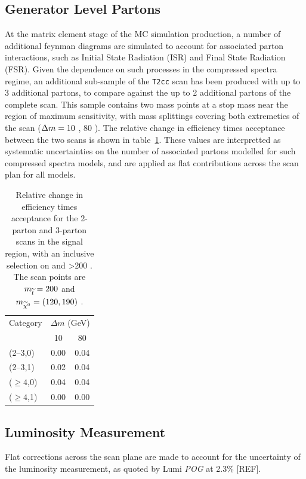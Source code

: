 \subsection{Generator Level Partons}
At the \MADGRAPH matrix element stage of the MC simulation production, a number
of additional feynman diagrams are simulated to account for associated parton 
interactions, such as Initial State Radiation (ISR) and Final State Radiation
(FSR). Given the dependence on such processes in the
compressed spectra regime, an additional sub-sample of the \texttt{T2cc} scan 
has been produced with up to 3 additional partons, to compare against the up to
2 additional partons of the complete scan. This sample contains two mass points 
at a stop mass near the region of maximum sensitivity, with mass splittings 
covering both extremeties of the scan ($\Delta m = 10$ \gev, 80 \gev). The relative
change in efficiency times 
acceptance between the two scans is shown in table~\ref{tab:sms-t2cc-2v3part}. 
These values are interpretted as systematic uncertainties on the number of 
associated partons modelled for such compressed spectra models, and are applied 
as flat contributions across the scan plan for all models.

\begin{table}[!h]
  \caption{Relative change in efficiency times acceptance for the
    2-parton and 3-parton scans in the signal region, with an inclusive 
    selection on \nb and \HT>200 \gev. The scan points are $m_{\widetilde{t}} = 200$ \gev 
    and $m_{\widetilde{\chi}^{0}} = (120, 190)$ \gev.}
  \label{tab:sms-t2cc-2v3part}
  \centering
  \small
  \begin{tabular}{ lcc }
    \hline
    \hline
    Category     & \multicolumn{2}{c}{$\Delta m$ (GeV)} \\
    \cline{2-3}
                 & 10   & 80                            \\
    \hline
    (2--3,0)     & 0.00 & 0.04                          \\
    (2--3,1)     & 0.02 & 0.04                          \\
    ($\geq 4$,0) & 0.04 & 0.04                          \\
    ($\geq 4$,1) & 0.00 & 0.00                          \\
    \hline
    \hline
  \end{tabular}
\end{table}

\subsection{Luminosity Measurement}
Flat corrections across the scan plane are made to account for the uncertainty 
of the luminosity measurement, as quoted by Lumi \emph{POG} at 2.3\% [REF].

